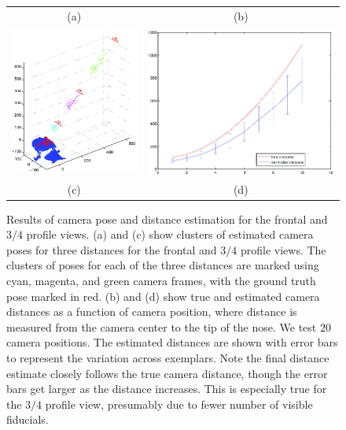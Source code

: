 \documentclass[runningheads]{llncs}
\begin{document}
\begin{figure}[ht!]
\begin{tabular}{cc}
(a) & (b) \\
\includegraphics[width=.5\linewidth]{resources/figures/cameraloc_3q.png} &
\includegraphics[width=.5\linewidth]{resources/figures/errorbar_3q.png} \\
(c) & (d)
\end{tabular}
\caption{	
Results of camera pose and distance estimation for the frontal and $3/4$ profile views.
(a) and (c) show clusters of estimated camera poses for three distances for the frontal and $3/4$ profile views.
The clusters of poses for each of the three distances are marked using cyan, magenta, and green camera frames, with the ground truth pose marked in red.
(b) and (d) show true and estimated camera distances as a function of camera position, where distance is measured from the camera center to the tip of the nose.
We test $20$ camera positions.
The estimated distances are shown with error bars to represent the variation across exemplars.
Note the final distance estimate closely follows the true camera distance, though the error bars get larger as the distance increases.  
This is especially true for the $3/4$ profile view, presumably due to fewer number of visible fiducials.   
}
\label{fig:results}
\end{figure}
\end{document}
